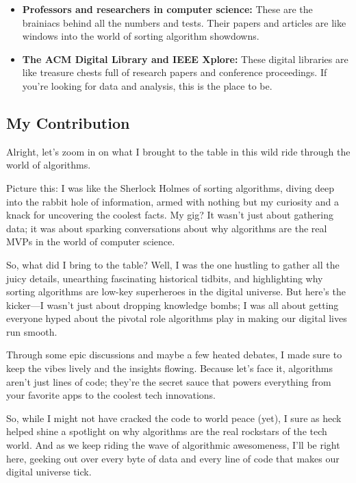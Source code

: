 \documentclass{article}
\begin{document}
\begin{itemize}
    \item \textbf{Professors and researchers in computer science:} These are the brainiacs behind all the numbers and tests. Their papers and articles are like windows into the world of sorting algorithm showdowns.
  
    \item \textbf{The ACM Digital Library and IEEE Xplore:} These digital libraries are like treasure chests full of research papers and conference proceedings. If you're looking for data and analysis, this is the place to be.
\end{itemize}

\subsection{My Contribution}

Alright, let's zoom in on what I brought to the table in this wild ride through the world of algorithms.

Picture this: I was like the Sherlock Holmes of sorting algorithms, diving deep into the rabbit hole of information, armed with nothing but my curiosity and a knack for uncovering the coolest facts. My gig? It wasn't just about gathering data; it was about sparking conversations about why algorithms are the real MVPs in the world of computer science.

So, what did I bring to the table? Well, I was the one hustling to gather all the juicy details, unearthing fascinating historical tidbits, and highlighting why sorting algorithms are low-key superheroes in the digital universe. But here's the kicker—I wasn't just about dropping knowledge bombs; I was all about getting everyone hyped about the pivotal role algorithms play in making our digital lives run smooth.

Through some epic discussions and maybe a few heated debates, I made sure to keep the vibes lively and the insights flowing. Because let's face it, algorithms aren't just lines of code; they're the secret sauce that powers everything from your favorite apps to the coolest tech innovations.

So, while I might not have cracked the code to world peace (yet), I sure as heck helped shine a spotlight on why algorithms are the real rockstars of the tech world. And as we keep riding the wave of algorithmic awesomeness, I'll be right here, geeking out over every byte of data and every line of code that makes our digital universe tick.
\end{document}
